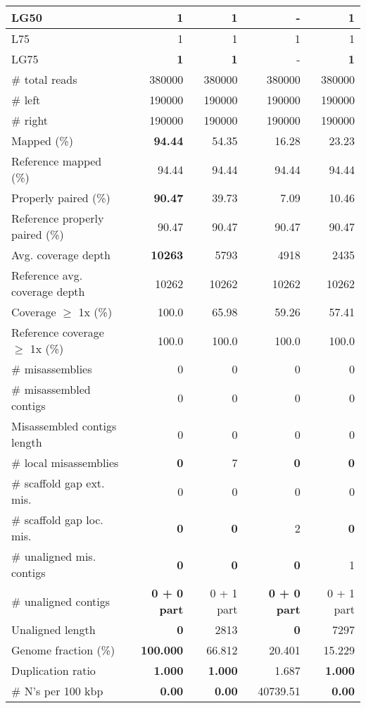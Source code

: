 \documentclass[12pt,a4paper]{article}
\begin{document}
\begin{table}[ht]
\begin{center}
\begin{tabular}{|l*{4}{|r}|}
LG50 & {\bf 1} & {\bf 1} & - & {\bf 1} \\ \hline
L75 & 1 & 1 & 1 & 1 \\ \hline
LG75 & {\bf 1} & {\bf 1} & - & {\bf 1} \\ \hline
\# total reads & 380000 & 380000 & 380000 & 380000 \\ \hline
\# left & 190000 & 190000 & 190000 & 190000 \\ \hline
\# right & 190000 & 190000 & 190000 & 190000 \\ \hline
Mapped (\%) & {\bf 94.44} & 54.35 & 16.28 & 23.23 \\ \hline
Reference mapped (\%) & 94.44 & 94.44 & 94.44 & 94.44 \\ \hline
Properly paired (\%) & {\bf 90.47} & 39.73 & 7.09 & 10.46 \\ \hline
Reference properly paired (\%) & 90.47 & 90.47 & 90.47 & 90.47 \\ \hline
Avg. coverage depth & {\bf 10263} & 5793 & 4918 & 2435 \\ \hline
Reference avg. coverage depth & 10262 & 10262 & 10262 & 10262 \\ \hline
Coverage $\geq$ 1x (\%) & 100.0 & 65.98 & 59.26 & 57.41 \\ \hline
Reference coverage $\geq$ 1x (\%) & 100.0 & 100.0 & 100.0 & 100.0 \\ \hline
\# misassemblies & 0 & 0 & 0 & 0 \\ \hline
\# misassembled contigs & 0 & 0 & 0 & 0 \\ \hline
Misassembled contigs length & 0 & 0 & 0 & 0 \\ \hline
\# local misassemblies & {\bf 0} & 7 & {\bf 0} & {\bf 0} \\ \hline
\# scaffold gap ext. mis. & 0 & 0 & 0 & 0 \\ \hline
\# scaffold gap loc. mis. & {\bf 0} & {\bf 0} & 2 & {\bf 0} \\ \hline
\# unaligned mis. contigs & {\bf 0} & {\bf 0} & {\bf 0} & 1 \\ \hline
\# unaligned contigs & {\bf 0 + 0 part} & 0 + 1 part & {\bf 0 + 0 part} & 0 + 1 part \\ \hline
Unaligned length & {\bf 0} & 2813 & {\bf 0} & 7297 \\ \hline
Genome fraction (\%) & {\bf 100.000} & 66.812 & 20.401 & 15.229 \\ \hline
Duplication ratio & {\bf 1.000} & {\bf 1.000} & 1.687 & {\bf 1.000} \\ \hline
\# N's per 100 kbp & {\bf 0.00} & {\bf 0.00} & 40739.51 & {\bf 0.00} \\ \hline

\end{tabular}
\end{center}
\end{table}
\end{document}
